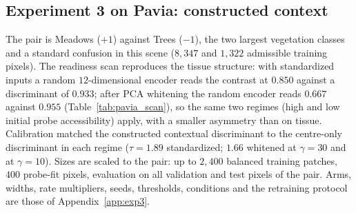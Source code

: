 \subsection{Experiment 3 on Pavia: constructed context}
The pair is Meadows ($+1$) against Trees ($-1$), the two largest vegetation classes
and a standard confusion in this scene ($8{,}347$ and $1{,}322$ admissible training
pixels). The readiness scan reproduces the tissue structure: with standardized inputs a
random $12$-dimensional encoder reads the contrast at $0.850$ against a discriminant of
$0.933$; after PCA whitening the random encoder reads $0.667$ against $0.955$
(Table~\ref{tab:pavia_scan}), so the same two regimes (high and low initial probe
accessibility) apply, with a smaller asymmetry than on tissue. Calibration matched the
constructed contextual discriminant to the centre-only discriminant in each regime
($\tau=1.89$ standardized; $1.66$ whitened at $\gamma=30$ and at $\gamma=10$). Sizes
are scaled to the pair: up to $2{,}400$ balanced training patches, $400$ probe-fit
pixels, evaluation on all validation and test pixels of the pair. Arms, widths, rate
multipliers, seeds, thresholds, conditions and the retraining protocol are those of
Appendix~\ref{app:exp3}.

